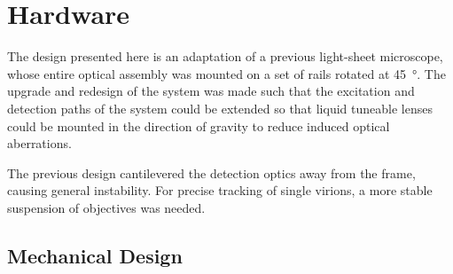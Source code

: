 %
%
%
%
%

\section{Hardware}

The design presented here is an adaptation of a previous light-sheet microscope, whose entire optical assembly was mounted on a set of rails rotated at \SI{45}{\degree}.
The upgrade and redesign of the system was made such that the excitation and detection paths of the system could be extended so that liquid tuneable lenses could be mounted in the direction of gravity to reduce induced optical aberrations.

The previous design cantilevered the detection optics away from the frame, causing general instability.
For precise tracking of single virions, a more stable suspension of objectives was needed.

\subsection{Mechanical Design}

